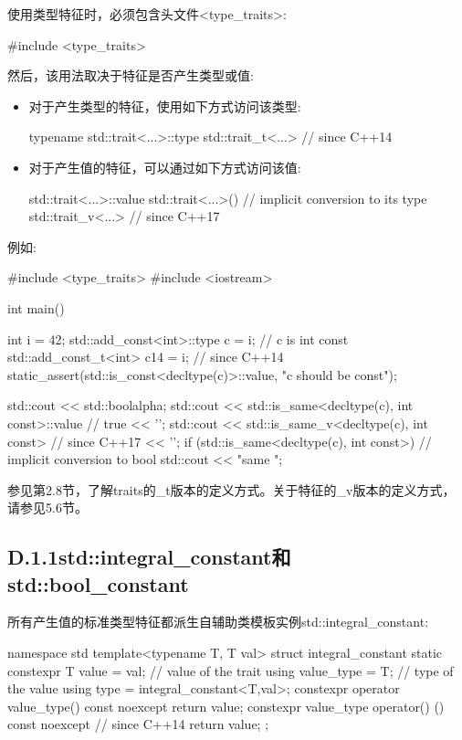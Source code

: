 
使用类型特征时，必须包含头文件<type\_traits>:

\begin{cpp}
#include <type_traits>
\end{cpp}

然后，该用法取决于特征是否产生类型或值:

\begin{itemize}
\item 
对于产生类型的特征，使用如下方式访问该类型:
\begin{cpp}
typename std::trait<...>::type
std::trait_t<...> // since C++14
\end{cpp}

\item 
对于产生值的特征，可以通过如下方式访问该值:
\begin{cpp}
std::trait<...>::value
std::trait<...>() // implicit conversion to its type
std::trait_v<...> // since C++17
\end{cpp}
\end{itemize}

例如:

\begin{cpp}
#include <type_traits>
#include <iostream>

int main()
{
	int i = 42;
	std::add_const<int>::type c = i; // c is int const
	std::add_const_t<int> c14 = i; // since C++14
	static_assert(std::is_const<decltype(c)>::value, "c should be const");
	
	std::cout << std::boolalpha;
	std::cout << std::is_same<decltype(c), int const>::value // true
			<< ’\n’;
	std::cout << std::is_same_v<decltype(c), int const> // since C++17
			<< ’\n’;
	if (std::is_same<decltype(c), int const>{}) { // implicit conversion to bool
		std::cout << "same \n";
	}
}
\end{cpp}

参见第2.8节，了解traits的\_t版本的定义方式。关于特征的\_v版本的定义方式，请参见5.6节。

\subsection{D.1.1\hspace{0.2cm}std::integral\_constant和std::bool\_constant}

所有产生值的标准类型特征都派生自辅助类模板实例std::integral\_constant:

\begin{cpp}
namespace std {
	template<typename T, T val>
	struct integral_constant {
		static constexpr T value = val; // value of the trait
		using value_type = T; // type of the value
		using type = integral_constant<T,val>;
		constexpr operator value_type() const noexcept {
			return value;
		}
		constexpr value_type operator() () const noexcept { // since C++14
			return value;
		}
	};
}
\end{cpp}

